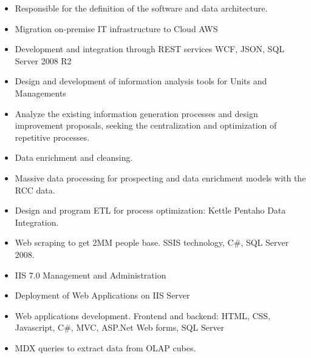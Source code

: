 \divider

\begin{itemize}
    \item Responsible for the definition of the software and data architecture.
    \item Migration on-premise IT infrastructure to Cloud AWS
    \item Development and integration through REST services WCF, JSON, SQL Server 2008 R2
    \item Design and development of information analysis tools for Units and Managements
    \item Analyze the existing information generation processes and design improvement proposals, seeking the centralization and optimization of repetitive processes.
    \item Data enrichment and cleansing.
    \item Massive data processing for prospecting and data enrichment models with the RCC data.
    \item Design and program ETL for process optimization: Kettle Pentaho Data Integration.
    \item Web scraping to get 2MM people base. SSIS technology, C\#, SQL Server 2008.
    \item IIS 7.0 Management and Administration
    \item Deployment of Web Applications on IIS Server
    \item Web applications development. Frontend and backend: HTML, CSS, Javascript, C\#, MVC, ASP.Net Web forms, SQL Server
    \item MDX queries to extract data from OLAP cubes.
\end{itemize}

\divider

